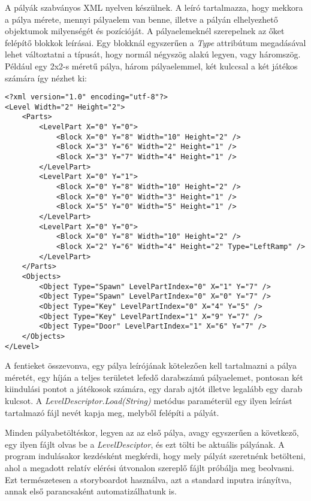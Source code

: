 A pályák szabványos XML nyelven készülnek. A leíró tartalmazza, hogy mekkora a pálya mérete, mennyi pályaelem van benne, illetve a pályán elhelyezhető objektumok milyenségét és pozícióját. A pályaelemeknél szerepelnek az őket felépítő blokkok leírásai. Egy blokknál egyszerűen a \emph{Type} attribútum megadásával lehet változtatni a típusát, hogy normál négyszög alakú legyen, vagy háromszög. Például egy 2x2-s méretű pálya, három pályaelemmel, két kulccsal a két játékos számára így nézhet ki:

\begin{verbatim}
<?xml version="1.0" encoding="utf-8"?>
<Level Width="2" Height="2">
    <Parts>
        <LevelPart X="0" Y="0">
            <Block X="0" Y="8" Width="10" Height="2" />
            <Block X="3" Y="6" Width="2" Height="1" />
            <Block X="3" Y="7" Width="4" Height="1" />
        </LevelPart>
        <LevelPart X="0" Y="1">
            <Block X="0" Y="8" Width="10" Height="2" />
            <Block X="0" Y="0" Width="3" Height="1" />
            <Block X="5" Y="0" Width="5" Height="1" />
        </LevelPart>
        <LevelPart X="0" Y="0">
            <Block X="0" Y="8" Width="10" Height="2" />
            <Block X="2" Y="6" Width="4" Height="2" Type="LeftRamp" />
        </LevelPart>
    </Parts>
    <Objects>
        <Object Type="Spawn" LevelPartIndex="0" X="1" Y="7" />
        <Object Type="Spawn" LevelPartIndex="0" X="0" Y="7" />
        <Object Type="Key" LevelPartIndex="0" X="4" Y="5" />
        <Object Type="Key" LevelPartIndex="1" X="9" Y="7" />
        <Object Type="Door" LevelPartIndex="1" X="6" Y="7" />
    </Objects>
</Level>
\end{verbatim}

A fentieket összevonva, egy pálya leírójának kötelezően kell tartalmazni a pálya méretét, egy híján a teljes területet lefedő darabszámú pályaelemet, pontosan két kiindulási pontot a játékosok számára, egy darab ajtót illetve legalább egy darab kulcsot. A \emph{LevelDescriptor.Load(String)} metódus paraméterül egy ilyen leírást tartalmazó fájl nevét kapja meg, melyből felépíti a pályát.

Minden pályabetöltéskor, legyen az az első pálya, avagy egyszerűen a következő, egy ilyen fájlt olvas be a \emph{LevelDesciptor}, és ezt tölti be aktuális pályának. A program indulásakor kezdésként megkérdi, hogy mely pályát szeretnénk betölteni, ahol a megadott relatív elérési útvonalon szereplő fájlt próbálja meg beolvasni. Ezt természetesen a storyboardot használva, azt a standard inputra irányítva, annak első parancsaként automatizálhatunk is.

